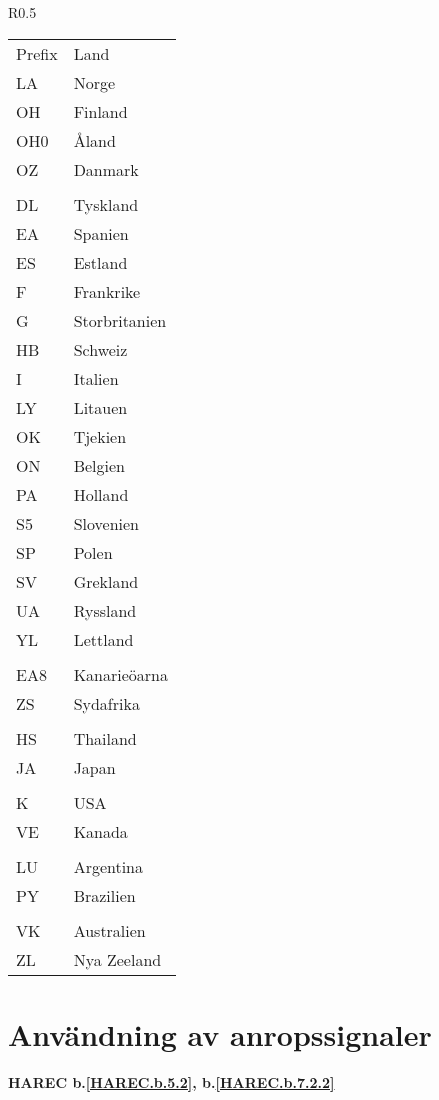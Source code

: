 \begin{wraptable}{R}{0.5\textwidth}
  \begin{tabular}{ll}
    Prefix & Land \\
    LA & Norge \\
    OH & Finland \\
    OH0 & Åland \\
    OZ & Danmark \\
    & \\
    DL & Tyskland \\
    EA & Spanien \\
    ES & Estland \\
    F & Frankrike \\
    G & Storbritanien \\
    HB & Schweiz \\
    I & Italien \\
    LY & Litauen \\
    OK & Tjekien \\
    ON & Belgien \\
    PA & Holland \\
    S5 & Slovenien \\
    SP & Polen \\
    SV & Grekland \\
    UA & Ryssland \\
    YL & Lettland \\
    & \\
    EA8 & Kanarieöarna \\
    ZS & Sydafrika \\
    & \\
    HS & Thailand \\
    JA & Japan \\
    & \\
    K & USA \\
    VE & Kanada \\
    & \\
    LU & Argentina \\
    PY & Brazilien \\
    & \\
    VK & Australien \\
    ZL & Nya Zeeland \\
\end{tabular}
\end{wraptable}


\section{Användning av anropssignaler}
\textbf{HAREC
  b.\ref{HAREC.b.5.2}\label{myHAREC.b.5.2},
  b.\ref{HAREC.b.7.2.2}\label{myHAREC.b.7.2.2}
}

